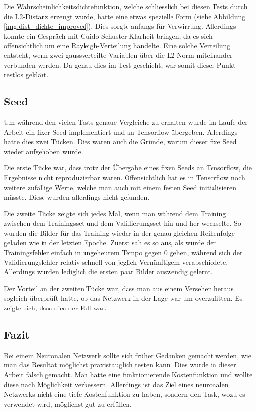 Die Wahrscheinlichkeitsdichtefunktion, welche schliesslich bei diesen Tests durch die L2-Distanz erzeugt wurde, hatte eine etwas spezielle Form (siehe Abbildung \ref{img:dist_dichte_improved}).
Dies sorgte anfangs für Verwirrung. 
Allerdings konnte ein Gespräch mit Guido Schuster \cite{PrivateCommunication} Klarheit bringen, da es sich \grqq{}offensichtlich\grqq{} um eine Rayleigh-Verteilung handelte. 
Eine solche Verteilung entsteht, wenn zwei gaussverteilte Variablen über die L2-Norm miteinander verbunden werden.
Da genau dies im Test geschieht, war somit dieser Punkt restlos geklärt.

\subsection{Seed}
Um während den vielen Tests genaue Vergleiche zu erhalten wurde im Laufe der Arbeit ein fixer Seed implementiert und an Tensorflow übergeben.
Allerdings hatte dies zwei Tücken.
Dies waren auch die Gründe, warum dieser fixe Seed wieder aufgehoben wurde.

Die erste Tücke war, dass trotz der Übergabe eines fixen Seeds an Tensorflow, die Ergebnisse nicht reproduzierbar waren.
Offensichtlich hat es in Tensorflow noch weitere zufällige Werte, welche man auch mit einem festen Seed initialisieren müsste.
Diese wurden allerdings nicht gefunden.

Die zweite Tücke zeigte sich jedes Mal, wenn man während dem Training zwischen dem Trainingsset und dem Validierungsset hin und her wechselte.
So wurden die Bilder für das Training wieder in der genau gleichen Reihenfolge geladen wie in der letzten Epoche.
Zuerst sah es so aus, als würde der Trainingsfehler einfach in ungeheurem Tempo gegen 0 gehen, während sich der Validierungsfehler relativ schnell von jeglich Vernünftigem verabschiedete.
Allerdings wurden lediglich die ersten paar Bilder auswendig gelernt.

Der Vorteil an der zweiten Tücke war, dass man aus einem Versehen heraus sogleich überprüft hatte, ob das Netzwerk in der Lage war um overzufitten.
Es zeigte sich, dass dies der Fall war.

\subsection{Fazit}
Bei einem Neuronalen Netzwerk sollte sich früher Gedanken gemacht werden, wie man das Resultat möglichst praxistauglich testen kann.
Dies wurde in dieser Arbeit falsch gemacht.
Man hatte eine funktionierende Kostenfunktion und wollte diese nach Möglichkeit verbessern.
Allerdings ist das Ziel eines neuronalen Netzwerks nicht eine tiefe Kostenfunktion zu haben, sondern den Task, wozu es verwendet wird, möglichst gut zu erfüllen.

